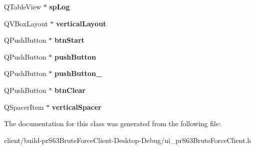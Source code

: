 \begin{DoxyCompactItemize}
\item 
\mbox{\label{class_ui__pr_s63_brute_force_client_a9b52aa440f4832221eb23cfc81dba6f5}} 
Q\+Table\+View $\ast$ {\bfseries sp\+Log}
\item 
\mbox{\label{class_ui__pr_s63_brute_force_client_a09f36226f0206a594aca5c75e5baf259}} 
Q\+V\+Box\+Layout $\ast$ {\bfseries vertical\+Layout}
\item 
\mbox{\label{class_ui__pr_s63_brute_force_client_a88dc7412d67867784313f4d98cb7b0b0}} 
Q\+Push\+Button $\ast$ {\bfseries btn\+Start}
\item 
\mbox{\label{class_ui__pr_s63_brute_force_client_aa0e006023940fd834b89e744537dc8c2}} 
Q\+Push\+Button $\ast$ {\bfseries push\+Button}
\item 
\mbox{\label{class_ui__pr_s63_brute_force_client_a312877d025783a7b6eaeecd595fda7c2}} 
Q\+Push\+Button $\ast$ {\bfseries push\+Button\+\_}
\item 
\mbox{\label{class_ui__pr_s63_brute_force_client_ab37e3b99c7f732e635b630b7fdb62c31}} 
Q\+Push\+Button $\ast$ {\bfseries btn\+Clear}
\item 
\mbox{\label{class_ui__pr_s63_brute_force_client_a0b24b644f617b9671b5f5833cc30dd2d}} 
Q\+Spacer\+Item $\ast$ {\bfseries vertical\+Spacer}
\end{DoxyCompactItemize}


The documentation for this class was generated from the following file\+:\begin{DoxyCompactItemize}
\item 
client/build-\/pr\+S63\+Brute\+Force\+Client-\/\+Desktop-\/\+Debug/ui\+\_\+pr\+S63\+Brute\+Force\+Client.\+h\end{DoxyCompactItemize}
